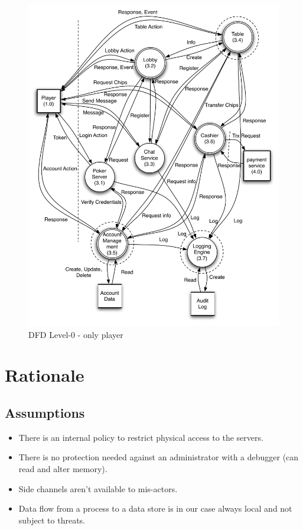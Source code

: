 \documentclass[a4paper,11pt]{report}
\begin{document}
\begin{figure}[htpb]
  \begin{center}
    \includegraphics[scale=0.7]{dfd_level_0_player}
  \end{center}
  \caption{DFD Level-0 - only player}\label{fig:level_0_player}
\end{figure}

\section{Rationale}
\subsection{Assumptions}
\begin{itemize}
\item There is an internal policy to restrict physical access to the servers.
\item There is no protection needed against an administrator with a debugger (can read and alter memory).
\item Side channels aren't available to mis-actors.
\item Data flow from a process to a data store is in our case always local and not subject to threats.
\end{itemize}
\end{document}
